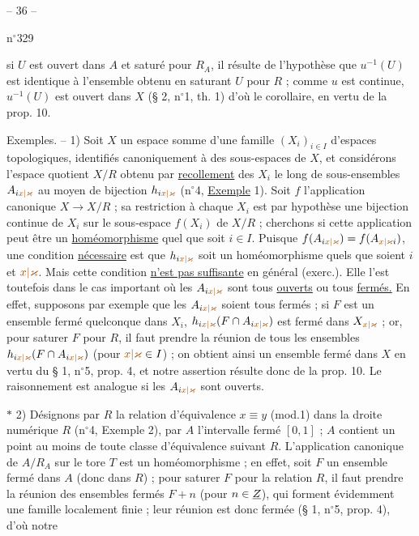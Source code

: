 \begin{center}-- 36 --\end{center}
\hfill n$^{\circ}$329

si $U$ est ouvert dans $A$ et saturé pour $R_A$, il résulte de l'hypothèse que $u^{-1}(U)$ est identique à l'ensemble obtenu en saturant $U$ pour $R$ ; comme $u$ est continue, $u^{-1}(U)$ est ouvert dans $X$ (§ 2, n$^{\circ}$1, th. 1) d'où le corollaire, en vertu de la prop. 10.

Exemples. -- 1) Soit $X$ un espace somme d'une famille $(X_i)_{i\in I}$ d'espaces topologiques, identifiés canoniquement à des sous-espaces de $X$, et considérons l'espace quotient $X/R$ obtenu par \uline{recollement} des $X_i$ le long de sous-ensembles $A_{i\unsure{x|\varkappa}}$ au moyen de bijection $h_{i\unsure{x|\varkappa}}$ (n$^{\circ}$4, \uline{Exemple} 1). Soit $f$ l'application canonique $X\to X/R$ ; sa restriction à chaque $X_i$ est par hypothèse une bijection continue de $X_i$ sur le sous-espace $f(X_i)$ de $X/R$ ; cherchons si cette application peut être un \uline{homéomorphisme} quel que soit $i\in I$. Puisque $f(A_{i\unsure{x|\varkappa}})=f(A_{\unsure{x|\varkappa}i})$, une condition \uline{nécessaire} est que $h_{i\unsure{x|\varkappa}}$ soit un homéomorphisme quels que soient $i$ et $\unsure{x|\varkappa}$. Mais cette condition \uline{n'est pas suffisante} en général (exerc.\quad). Elle l'est toutefois dans le cas important où les $A_{i\unsure{x|\varkappa}}$ sont tous \uline{ouverts} ou tous \uline{fermés.} En effet, supposons par exemple que les $A_{i\unsure{x|\varkappa}}$ soient tous fermés ; si $F$ est un ensemble fermé quelconque dans $X_i$, $h_{i\unsure{x|\varkappa}}(F\cap A_{i\unsure{x|\varkappa}})$ est fermé dans $X_{\unsure{x|\varkappa}}$ ; or, pour saturer $F$ pour $R$, il faut prendre la réunion de tous les ensembles $h_{i\unsure{x|\varkappa}}(F\cap A_{i\unsure{x|\varkappa}})$ (pour $\unsure{x|\varkappa}\in I$) ; on obtient ainsi un ensemble fermé dans $X$ en vertu du § 1, n$^{\circ}$5, prop. 4, et notre assertion résulte donc de la prop. 10. Le raisonnement est analogue si les $A_{i\unsure{x|\varkappa}}$ sont ouverts.

$*$ 2) Désignons par $R$ la relation d'équivalence $x\equiv y$ (mod.1) dans la droite numérique \uline{$R$} (n$^{\circ}$4, Exemple 2), par $A$ l'intervalle fermé $[0,1]$ ; $A$ contient un point au moins de toute classe d'équivalence suivant $R$. L'application canonique de $A/R_A$ sur le tore \uline{$T$} est un homéomorphisme ; en effet, soit $F$ un ensemble fermé dans $A$ (donc dans \uline{$R$}) ; pour saturer $F$ pour la relation $R$, il faut prendre la réunion des ensembles fermés $F+n$ (pour $n\in\text{\underline{$Z$}}$), qui forment évidemment une famille localement finie ; leur réunion est donc fermée (§ 1, n$^{\circ}$5, prop. 4), d'où notre
